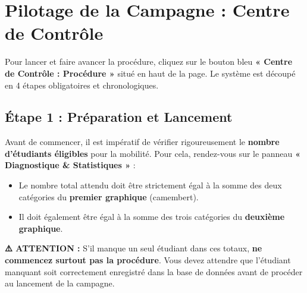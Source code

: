 \documentclass[12pt,a4paper]{article}
\begin{document}
\section{Pilotage de la Campagne : Centre de Contrôle}
Pour lancer et faire avancer la procédure, cliquez sur le bouton bleu \textbf{« Centre de Contrôle : Procédure »} situé en haut de la page. Le système est découpé en 4 étapes obligatoires et chronologiques.

\subsection{Étape 1 : Préparation et Lancement}
\begin{tcolorbox}[colback=yellow!10!white,colframe=orange!80!black,title=Vérification Préalable Cruciale]
Avant de commencer, il est impératif de vérifier rigoureusement le \textbf{nombre d'étudiants éligibles} pour la mobilité. Pour cela, rendez-vous sur le panneau \textbf{« Diagnostique \& Statistiques »} :
\begin{itemize}[leftmargin=*]
    \item Le nombre total attendu doit être strictement égal à la somme des deux catégories du \textbf{premier graphique} (camembert).
    \item Il doit également être égal à la somme des trois catégories du \textbf{deuxième graphique}.
\end{itemize}
\textbf{⚠️ ATTENTION :} S'il manque un seul étudiant dans ces totaux, \textbf{ne commencez surtout pas la procédure}. Vous devez attendre que l'étudiant manquant soit correctement enregistré dans la base de données avant de procéder au lancement de la campagne.
\end{tcolorbox}
\end{document}
